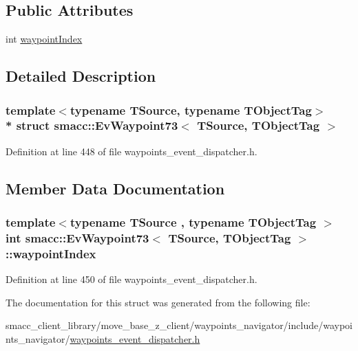 \subsection*{Public Attributes}
\begin{DoxyCompactItemize}
\item 
int \hyperlink{structsmacc_1_1EvWaypoint73_a797baf8eef54a00dd12c76cabddae6fb}{waypoint\+Index}
\end{DoxyCompactItemize}


\subsection{Detailed Description}
\subsubsection*{template$<$typename T\+Source, typename T\+Object\+Tag$>$\\*
struct smacc\+::\+Ev\+Waypoint73$<$ T\+Source, T\+Object\+Tag $>$}



Definition at line 448 of file waypoints\+\_\+event\+\_\+dispatcher.\+h.



\subsection{Member Data Documentation}
\subsubsection[{\texorpdfstring{waypoint\+Index}{waypointIndex}}]{\setlength{\rightskip}{0pt plus 5cm}template$<$typename T\+Source , typename T\+Object\+Tag $>$ int {\bf smacc\+::\+Ev\+Waypoint73}$<$ T\+Source, T\+Object\+Tag $>$\+::waypoint\+Index}\hypertarget{structsmacc_1_1EvWaypoint73_a797baf8eef54a00dd12c76cabddae6fb}{}\label{structsmacc_1_1EvWaypoint73_a797baf8eef54a00dd12c76cabddae6fb}


Definition at line 450 of file waypoints\+\_\+event\+\_\+dispatcher.\+h.



The documentation for this struct was generated from the following file\+:\begin{DoxyCompactItemize}
\item 
smacc\+\_\+client\+\_\+library/move\+\_\+base\+\_\+z\+\_\+client/waypoints\+\_\+navigator/include/waypoints\+\_\+navigator/\hyperlink{waypoints__event__dispatcher_8h}{waypoints\+\_\+event\+\_\+dispatcher.\+h}\end{DoxyCompactItemize}

